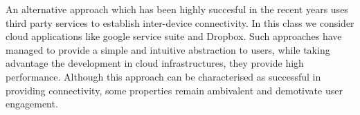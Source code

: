 

An alternative approach which has been highly succesful in the recent years uses
third party services to establish inter-device connectivity.  In this class we
consider cloud applications like google service suite and
Dropbox. Such approaches have managed to provide a simple and intuitive
abstraction to users, while taking advantage the development in cloud
infrastructures, they provide high performance. Although this approach can be
characterised as successful in providing connectivity, some properties remain
ambivalent and demotivate user engagement. 

